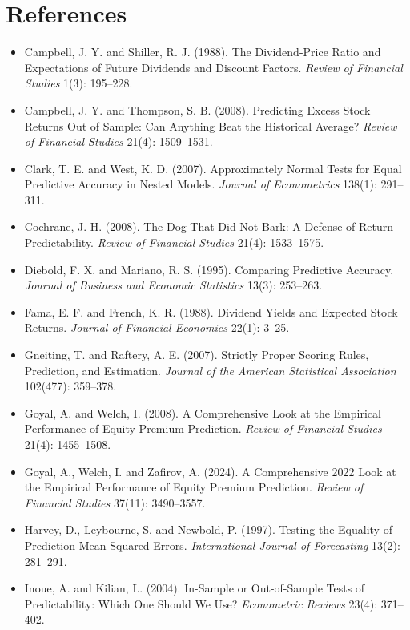 \section*{References}

\begin{itemize}
  \item Campbell, J. Y. and Shiller, R. J. (1988). The Dividend-Price Ratio and Expectations of Future Dividends and Discount Factors. \emph{Review of Financial Studies} 1(3): 195--228.
  \item Campbell, J. Y. and Thompson, S. B. (2008). Predicting Excess Stock Returns Out of Sample: Can Anything Beat the Historical Average? \emph{Review of Financial Studies} 21(4): 1509--1531.
  \item Clark, T. E. and West, K. D. (2007). Approximately Normal Tests for Equal Predictive Accuracy in Nested Models. \emph{Journal of Econometrics} 138(1): 291--311.
  \item Cochrane, J. H. (2008). The Dog That Did Not Bark: A Defense of Return Predictability. \emph{Review of Financial Studies} 21(4): 1533--1575.
  \item Diebold, F. X. and Mariano, R. S. (1995). Comparing Predictive Accuracy. \emph{Journal of Business and Economic Statistics} 13(3): 253--263.
  \item Fama, E. F. and French, K. R. (1988). Dividend Yields and Expected Stock Returns. \emph{Journal of Financial Economics} 22(1): 3--25.
  \item Gneiting, T. and Raftery, A. E. (2007). Strictly Proper Scoring Rules, Prediction, and Estimation. \emph{Journal of the American Statistical Association} 102(477): 359--378.
  \item Goyal, A. and Welch, I. (2008). A Comprehensive Look at the Empirical Performance of Equity Premium Prediction. \emph{Review of Financial Studies} 21(4): 1455--1508.
  \item Goyal, A., Welch, I. and Zafirov, A. (2024). A Comprehensive 2022 Look at the Empirical Performance of Equity Premium Prediction. \emph{Review of Financial Studies} 37(11): 3490--3557.
  \item Harvey, D., Leybourne, S. and Newbold, P. (1997). Testing the Equality of Prediction Mean Squared Errors. \emph{International Journal of Forecasting} 13(2): 281--291.
  \item Inoue, A. and Kilian, L. (2004). In-Sample or Out-of-Sample Tests of Predictability: Which One Should We Use? \emph{Econometric Reviews} 23(4): 371--402.

\end{itemize}
